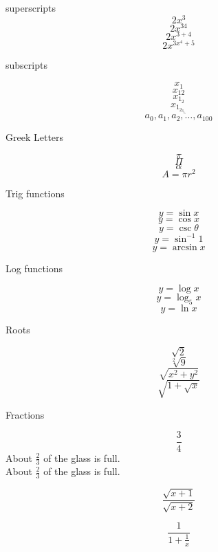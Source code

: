 \documentclass[11pt]{article}
\begin{document}
superscripts $$2x^3$$
$$2x^{34}$$
$$2x^{3+4}$$
$$2x^{3x^4+5}$$

subscripts

$$x_1$$
$$x_{12}$$
$$x_{1_2}$$
$$x_{1_{2_{3_{4_5}}}}$$
$$a_0,a_1,a_2, \ldots, a_{100}$$

Greek Letters

$$\pi$$
$$\Pi$$
$$\alpha$$
$$A= \pi r^2$$


Trig functions

$$y =\sin x$$
$$y = \cos x$$
$$y = \csc \theta$$
$$y = \sin^{-1} 1$$
$$y = \arcsin x$$


Log functions

$$y=\log x$$
$$y=\log_5 x$$
$$y = \ln x$$


Roots

$$\sqrt{2}$$
$$\sqrt[2]{9}$$
$$\sqrt{x^2+ y^2}$$
$$\sqrt{ 1+ \sqrt{x}  }$$


Fractions

$$\frac{3}{4}$$
About $ \displaystyle  \frac{2}{3}$ of the glass is full.\\[16pt]
About $\frac{2}{3}$ of the glass is full.

$$\frac{\sqrt{x+1}}{\sqrt{x+2}} $$

$$\frac{1}{1 + \frac{1}{x}} $$
\end{document}
